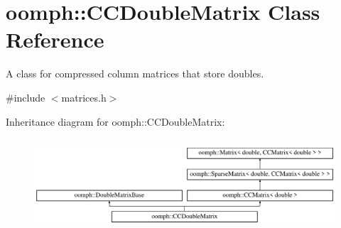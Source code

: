 \hypertarget{classoomph_1_1CCDoubleMatrix}{}\section{oomph\+:\+:C\+C\+Double\+Matrix Class Reference}
\label{classoomph_1_1CCDoubleMatrix}


A class for compressed column matrices that store doubles.  




{\ttfamily \#include $<$matrices.\+h$>$}

Inheritance diagram for oomph\+:\+:C\+C\+Double\+Matrix\+:\begin{figure}[H]
\begin{center}
\leavevmode
\includegraphics[height=3.456790cm]{classoomph_1_1CCDoubleMatrix}
\end{center}
\end{figure}
